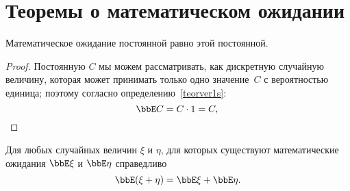 \section{Теоремы о математическом ожидании}
\begin{thm}\label{ch31.3thm1}
Математическое ожидание постоянной равно этой постоянной.
\end{thm}
\begin{proof}
Постоянную $C$ мы можем рассматривать, как дискретную случайную величину, которая может принимать только одно значение~$C$ с вероятностью единица; поэтому согласно определению~\ref{teorver1s}:
\begin{equation*}
\bbE C = C\cdot1=C, \qedhere
\end{equation*}
\end{proof}
\begin{thm}\label{ch31.2t1}
Для любых случайных величин $\xi$ и $\eta$, для которых существуют математические ожидания $\bbE\xi$ и $\bbE\eta$ справедливо\footnotemark
\begin{equation}
\bbE(\xi+\eta) = \bbE\xi+\bbE\eta.
\end{equation}
\end{thm}

